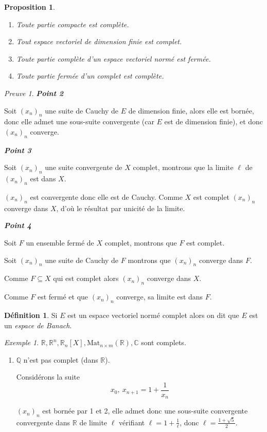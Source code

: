 \documentclass[]{article}
\newtheorem{myproposition}{Proposition}
\theoremstyle{remark}
\newtheorem{myproof}{Preuve}
\newtheorem{myexmpl}{Exemple}
\theoremstyle{definition}
\newtheorem{mydef}{Définition}
\newenvironment{proofpart}[1]{
	\leavevmode
	
	\noindent
	{\textit{\textbf{\boldmath #1}}}
	
}{
	\checkmark
}
\begin{document}
\begin{myproposition}
	\leavevmode
	\begin{enumerate}
		\item Toute partie compacte est complète.
		\item Tout espace vectoriel de dimension finie est complet.
		\item Toute partie complète d'un espace vectoriel normé est fermée.
		\item Toute partie fermée d'un complet est complète.
	\end{enumerate}
\end{myproposition}

\begin{myproof}
	\begin{proofpart}{Point 2}
		Soit $(x_n)_n$ une suite de Cauchy de $E$ de dimension finie, alors elle est bornée, donc elle admet une sous-suite convergente (car $E$ est de dimension finie), et donc $(x_n)_n$ converge.
	\end{proofpart}
	
	\begin{proofpart}{Point 3}
		Soit $(x_n)_n$ une suite convergente de $X$ complet, montrons que la limite $\ell$ de $(x_n)_n$ est dans $X$.
		
		$(x_n)_n$ est convergente donc elle est de Cauchy. Comme $X$ est complet $(x_n)_n$ converge dans $X$, d'où le résultat par unicité de la limite.
	\end{proofpart}
	
	\begin{proofpart}{Point 4}
		Soit $F$ un ensemble fermé de $X$ complet, montrons que $F$ est complet.
		
		Soit $(x_n)_n$ une suite de Cauchy de $F$ montrons que $(x_n)_n$ converge dans $F$.
		
		Comme $F \subseteq X$ qui est complet alors $(x_n)_n$ converge dans $X$.
		
		Comme $F$ est fermé et que $(x_n)_n$ converge, sa limite est dans $F$.
	\end{proofpart}
\end{myproof}

\begin{mydef}
	Si $E$ est un espace vectoriel normé complet alors on dit que $E$ est un \textit{espace de Banach}.
\end{mydef}

\begin{myexmpl}
	$\mathbb{R}, \mathbb{R}^n, \mathbb{R}_n[X], \text{Mat}_{n \times m}(\mathbb{R}), \mathbb{C}$ sont complets.
	
	\begin{enumerate}
		\item $\mathbb{Q}$ n'est pas complet (dans $\mathbb{R}$).

		Considérons la suite $$x_0, ~ x_{n+1} = 1 + \frac{1}{x_n}$$
		
		$(x_n)_n$ est bornée par 1 et 2, elle admet donc une sous-suite convergente convergente dans $\mathbb{R}$ de limite $\ell$ vérifiant $\ell = 1 + \frac{1}{\ell}$, donc $\ell = \frac{1+\sqrt{5}}{2}$.
	\end{enumerate}
\end{myexmpl}
\end{document}
